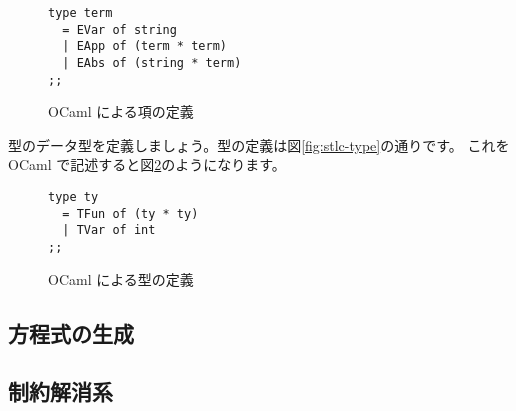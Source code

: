 \begin{figure}[htbp]
\begin{lstlisting}
type term
  = EVar of string
  | EApp of (term * term)
  | EAbs of (string * term)
;;
\end{lstlisting}
 \caption{OCaml による項の定義}
 \label{fig:ocaml-def-term}
\end{figure}


型のデータ型を定義しましょう。型の定義は図\ref{fig:stlc-type}の通りです。
これを OCaml で記述すると図\ref{fig:ocaml-def-type}のようになります。

\begin{figure}[htbp]
\begin{lstlisting}
type ty
  = TFun of (ty * ty)
  | TVar of int
;;
\end{lstlisting}
 \caption{OCaml による型の定義}
 \label{fig:ocaml-def-type}
\end{figure}

\subsection{方程式の生成}



\subsection{制約解消系}



